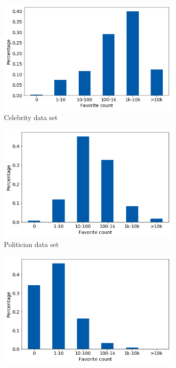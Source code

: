 \begin{figure}[h]
\begin{subfigure}{.45\textwidth}
  \includegraphics[width=.95\linewidth]{img/celeb_fav_distr}
  \caption{Celebrity data set}
  \label{fig:fav_distr_sub1}
\end{subfigure}%
\begin{subfigure}{.45\textwidth}
  \includegraphics[width=.95\linewidth]{img/polit_fav_distr}
  \caption{Politician data set}
  \label{fig:fav_distr_sub2}
\end{subfigure}
\begin{subfigure}{.45\textwidth}
  \includegraphics[width=.95\linewidth]{img/corp_fav_distr}

\end{subfigure}
\end{figure}
